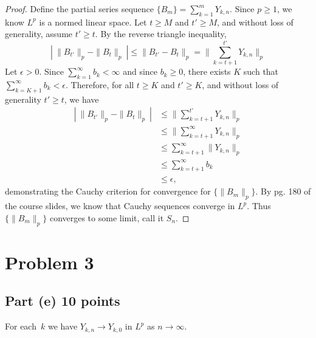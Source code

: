 \documentclass[letterpaper, 12pt]{article}
\begin{document}
\begin{proof}
Define the partial series sequence $\{B_m\} = \sum_{k = 1}^{m} Y_{k, n}$. 
Since $p \geq 1$, we know $L^p$ is a normed linear space.
Let $t \geq M$ and $t' \geq M$, and without loss of generality, assume $t' \geq t$. By the reverse triangle inequality, 
\[
|~ \| B_{t'} \|_p - \| B_t \|_p ~| \leq  \| B_{t'} - B_t \|_p = \| \sum_{k = t+1}^{t'} Y_{k, n} \|_p
\]
Let $\epsilon > 0$. Since $\sum_{k = 1}^{\infty} b_k < \infty$ and since $b_k \geq 0$, there exists $K$ such that $\sum_{k = K + 1}^{\infty} b_k < \epsilon$. 
Therefore, for all $t \geq K$ and $t' \geq K$, and without loss of generality $t' \geq t$,  we have 
\begin{align*}
|~ \| B_{t'} \|_p - \| B_t \|_p ~| 
&\leq \| \sum_{k = t+1}^{t'} Y_{k, n} \|_p \\
&\leq \| \sum_{k = t+1}^{\infty} Y_{k, n} \|_p \\
&\leq \sum_{k = t+1}^{\infty}  \| Y_{k, n} \|_p \\  
&\leq \sum_{k = t+1}^{\infty} b_k \\
&\leq \epsilon
\text{,}
\end{align*}
demonstrating the Cauchy criterion for convergence for $\{\|B_m \|_p \}$. 
By pg. 180 of the course slides, we know that Cauchy sequences converge in $L^p$. 
Thus $\{\|B_m \|_p \}$ converges to some limit, call it $S_n$.
\end{proof}
\pagebreak




\section*{Problem 3}
\subsection*{Part (e) 10 points}
For each~$k$ we have $Y_{k, n} \to Y_{k, 0}$ in $L^p$ as $n \to \infty$.
\end{document}
